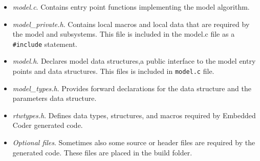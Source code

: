 \begin{itemize} %
\item \emph{model.c}. Contains entry point functions implementing the model algorithm.
\item \emph{model\_private.h}. Contains local macros and local data that are required by the model and subsystems. This file is included in the model.c file as a \verb|#include| statement.
\item \emph{model.h}. Declares model data structures,a public interface to the model
entry points and data structures. This files is included in \verb|model.c| file.
\item \emph{model\_types.h}. Provides forward declarations for the data structure and the parameters data structure.
\item \emph{rtwtypes.h}. Defines data types, structures, and macros required by Embedded Coder generated code.
\item \emph{Optional files}. Sometimes also some source or header files are required by the generated code. These files are placed in the build folder.
\end{itemize}

